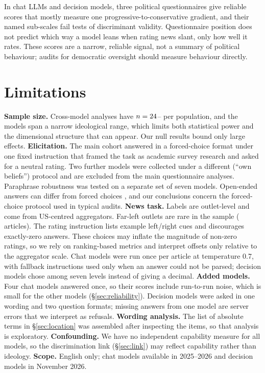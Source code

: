 \documentclass[11pt]{article}
\begin{document}
In \nNModels{} chat LLMs and \nDNComplete{} decision models, three political questionnaires give reliable scores that mostly measure one progressive-to-conservative gradient, and their named sub-scales fail tests of discriminant validity. Questionnaire position does not predict which way a model leans when rating news slant, only how well it rates. These scores are a narrow, reliable signal, not a summary of political behaviour; audits for democratic oversight should measure behaviour directly.

\section*{Limitations}

\textbf{Sample size.} Cross-model analyses have $n=24$--\nNModels{} per population, and the models span a narrow ideological range, which limits both statistical power and the dimensional structure that can appear. Our null results bound only large effects.
\textbf{Elicitation.} The main cohort answered in a forced-choice format under one fixed instruction that framed the task as academic survey research and asked for a neutral rating. Two further models were collected under a different (``own beliefs'') protocol and are excluded from the main questionnaire analyses. Paraphrase robustness was tested on a separate set of seven models. Open-ended answers can differ from forced choices \citep{rottger-etal-2024-political}, and our conclusions concern the forced-choice protocol used in typical audits.
\textbf{News task.} Labels are outlet-level and come from US-centred aggregators. Far-left outlets are rare in the sample (\nNFarLeft{} articles). The rating instruction lists example left/right cues and discourages exactly-zero answers. These choices may inflate the magnitude of non-zero ratings, so we rely on ranking-based metrics and interpret offsets only relative to the aggregator scale. Chat models were run once per article at temperature 0.7, with fallback instructions used only when an answer could not be parsed; decision models chose among seven levels instead of giving a decimal.
\textbf{Added models.} Four chat models answered once, so their scores include run-to-run noise, which is small for the other models (\S\ref{sec:reliability}). Decision models were asked in one wording and two question formats; missing answers from one model are server errors that we interpret as refusals.
\textbf{Wording analysis.} The list of absolute terms in \S\ref{sec:location} was assembled after inspecting the items, so that analysis is exploratory. \textbf{Confounding.} We have no independent capability measure for all models, so the discrimination link (\S\ref{sec:link}) may reflect capability rather than ideology.
\textbf{Scope.} English only; chat models available in 2025--2026 and decision models in November 2026.
\end{document}

